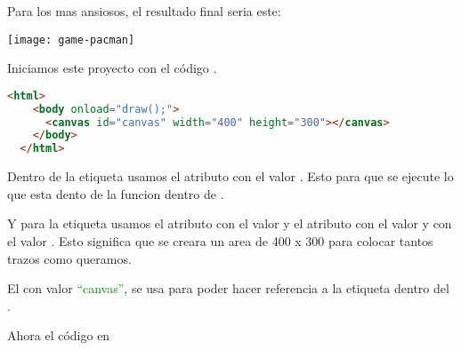 Para los mas ansiosos, el resultado final seria este:

\vspace{0.5cm} %
\begin{center}
	\texttt{[image: game-pacman]} %
\end{center}
\vspace{0.5cm} %

Iniciamos este proyecto con el código .

\begin{lstlisting}[language=HTML, style=mystyle2]
  <html>
    <body onload="draw();">
      <canvas id="canvas" width="400" height="300"></canvas>
    </body>
  </html>
\end{lstlisting}

Dentro de la etiqueta  usamos el atributo  con el valor . Esto para que se ejecute lo que esta dento de la funcion  dentro de .

Y para la etiqueta  usamos el atributo  con el valor  y el atributo  con el valor  y  con el valor . Esto significa que se creara un area de 400 x 300 para colocar tantos trazos como queramos.

El  con valor \textcolor{green}{``canvas''}, se usa para poder hacer referencia a la etiqueta  dentro del .


\newpage %
Ahora el código en 

